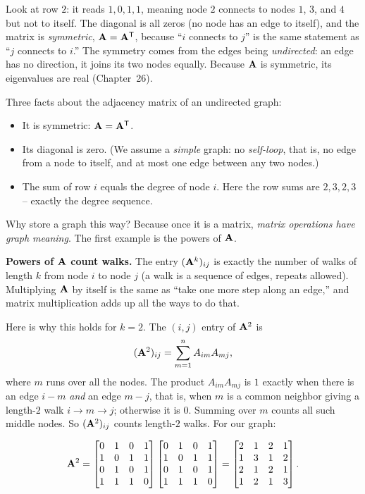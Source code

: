Look at row $2$: it reads $1,0,1,1$, meaning node $2$ connects to nodes $1$, $3$, and $4$
but not to itself. The diagonal is all zeros (no node has an edge to itself), and the
matrix is \emph{symmetric}, $\mathbf{A} = \mathbf{A}^{\mathsf{T}}$, because ``$i$ connects to $j$'' is the
same statement as ``$j$ connects to $i$.'' The symmetry comes from the edges being
\emph{undirected}: an edge has no direction, it joins its two nodes equally. Because
$\mathbf{A}$ is symmetric, its eigenvalues are real (Chapter~26).

\begin{focusbox}
Three facts about the adjacency matrix of an undirected graph:
\begin{itemize}
\item It is symmetric: $\mathbf{A} = \mathbf{A}^{\mathsf{T}}$.
\item Its diagonal is zero. (We assume a \emph{simple} graph: no \emph{self-loop}, that
is, no edge from a node to itself, and at most one edge between any two nodes.)
\item The sum of row $i$ equals the degree of node $i$. Here the row sums are
$2,3,2,3$ -- exactly the degree sequence.
\end{itemize}
\end{focusbox}

Why store a graph this way? Because once it is a matrix, \emph{matrix operations have
graph meaning}. The first example is the powers of $\mathbf{A}$.

\begin{intuitionbox}
\textbf{Powers of $\mathbf{A}$ count walks.} The entry $(\mathbf{A}^k)_{ij}$ is exactly the
number of walks of length $k$ from node $i$ to node $j$ (a walk is a sequence of edges,
repeats allowed). Multiplying $\mathbf{A}$ by itself is the same as ``take one more step
along an edge,'' and matrix multiplication adds up all the ways to do that.
\end{intuitionbox}

Here is why this holds for $k=2$. The $(i,j)$ entry of $\mathbf{A}^2$ is
\[
(\mathbf{A}^2)_{ij} = \sum_{m=1}^{n} A_{im}A_{mj},
\]
where $m$ runs over all the nodes. The product $A_{im}A_{mj}$ is $1$ exactly when there is
an edge $i\!-\!m$ \emph{and} an edge $m\!-\!j$, that is, when $m$ is a common neighbor giving
a length-$2$ walk $i \to m \to j$; otherwise it is $0$. Summing over $m$ counts all such
middle nodes. So $(\mathbf{A}^2)_{ij}$ counts length-$2$ walks. For our graph:

\[
\mathbf{A}^2 =
\begin{bmatrix}
0&1&0&1\\1&0&1&1\\0&1&0&1\\1&1&1&0
\end{bmatrix}
\begin{bmatrix}
0&1&0&1\\1&0&1&1\\0&1&0&1\\1&1&1&0
\end{bmatrix}
=
\begin{bmatrix}
2&1&2&1\\1&3&1&2\\2&1&2&1\\1&2&1&3
\end{bmatrix}.
\]

